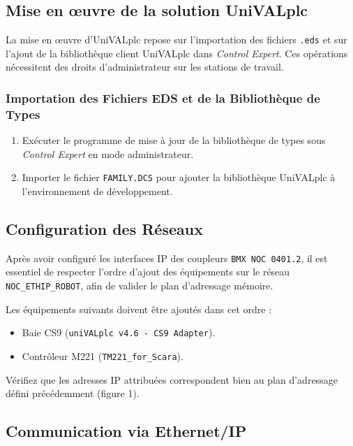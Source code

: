 
\subsection{Mise en œuvre de la solution UniVALplc}

La mise en œuvre d'UniVALplc repose sur l'importation des fichiers \texttt{.eds} et sur l'ajout de la bibliothèque client UniVALplc dans \textit{Control Expert}. Ces opérations nécessitent des droits d'administrateur sur les stations de travail.

\subsubsection{Importation des Fichiers EDS et de la Bibliothèque de Types}

\begin{enumerate}
    \item Exécuter le programme de mise à jour de la bibliothèque de types sous \textit{Control Expert} en mode administrateur.
    \item Importer le fichier \texttt{FAMILY.DCS} pour ajouter la bibliothèque UniVALplc à l'environnement de développement.
\end{enumerate}

\subsection{Configuration des Réseaux}

Après avoir configuré les interfaces IP des coupleurs \texttt{BMX NOC 0401.2}, il est essentiel de respecter l'ordre d'ajout des équipements sur le réseau \texttt{NOC\_ETHIP\_ROBOT}, afin de valider le plan d'adressage mémoire.

Les équipements suivants doivent être ajoutés dans cet ordre :
\begin{itemize}
    \item Baie CS9 (\texttt{uniVALplc v4.6 - CS9 Adapter}).
    \item Contrôleur M221 (\texttt{TM221\_for\_Scara}).
\end{itemize}

Vérifiez que les adresses IP attribuées correspondent bien au plan d'adressage défini précédemment (figure 1).

\subsection{Communication via Ethernet/IP}


